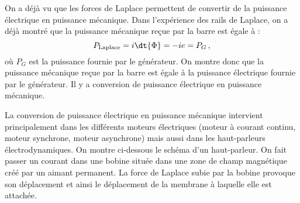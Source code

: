 \documentclass{cours}
\begin{document}
On a déjà vu que les forces de Laplace permettent de convertir de la puissance électrique en puissance mécanique. Dans l'expérience des rails de Laplace, on a déjà montré que la puissance mécanique reçue par la barre est égale à :
\begin{equation}
  P_\text{Laplace} = i \dt{\Phi} = -ie = P_G\, ,
\end{equation}
où $P_G$ est la puissance fournie par le générateur. On montre donc que la puissance mécanique reçue par la barre est égale à la puissance électrique fournie par le générateur. Il y a conversion de puissance électrique en puissance mécanique.

\begin{center}
\end{center}

La conversion de puissance électrique en puissance mécanique intervient principalement dans les différents moteurs électriques (moteur à courant continu, moteur synchrone, moteur asynchrone) mais aussi dans les haut-parleurs électrodynamiques. On montre ci-dessous le schéma d'un haut-parleur. On fait passer un courant dans une bobine située dans une zone de champ magnétique créé par un aimant permanent. La force de Laplace subie par la bobine provoque son déplacement et ainsi le déplacement de la membrane à laquelle elle est attachée. 
\end{document}
